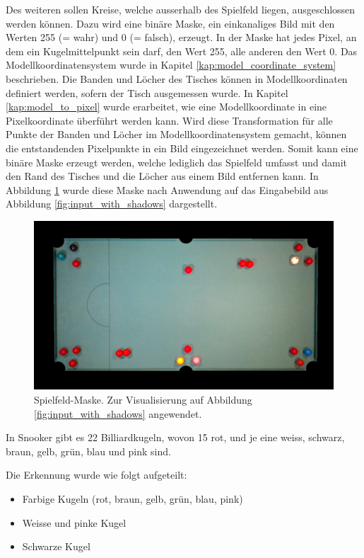 Des weiteren sollen Kreise, welche ausserhalb des Spielfeld liegen, ausgeschlossen werden können.
Dazu wird eine binäre Maske, ein einkanaliges Bild mit den Werten 255 (= wahr) und 0 (= falsch), erzeugt.
In der Maske hat jedes Pixel, an dem ein Kugelmittelpunkt sein darf, den Wert 255, alle anderen den Wert 0.
Das Modellkoordinatensystem wurde in Kapitel \ref{kap:model_coordinate_system} beschrieben.
Die Banden und Löcher des Tisches können in Modellkoordinaten definiert werden, sofern der Tisch ausgemessen wurde.
In Kapitel \ref{kap:model_to_pixel} wurde erarbeitet, wie eine Modellkoordinate in eine Pixelkoordinate überführt werden kann.
Wird diese Transformation für alle Punkte der Banden und Löcher im Modellkoordinatensystem gemacht, können die
entstandenden Pixelpunkte in ein Bild eingezeichnet werden.
Somit kann eine binäre Maske erzeugt werden, welche lediglich das Spielfeld umfasst und damit den Rand des Tisches
und die Löcher aus einem Bild entfernen kann. In Abbildung \ref{fig:table_mask_applied} wurde diese Maske nach Anwendung
auf das Eingabebild aus Abbildung \ref{fig:input_with_shadows} dargestellt.

\begin{figure}[h!]
    \begin{center}
    \includegraphics[width=0.8\linewidth]{../common/resources/detection/table_mask_applied.png}
    \end{center}
    \caption{Spielfeld-Maske. Zur Visualisierung auf Abbildung \ref{fig:input_with_shadows} angewendet.}
    \label{fig:table_mask_applied}
\end{figure}

In Snooker gibt es 22 Billiardkugeln, wovon 15 rot, und je eine weiss, schwarz, braun, gelb, grün, blau und pink sind.

Die Erkennung wurde wie folgt aufgeteilt:
\begin{itemize}
  \item Farbige Kugeln (rot, braun, gelb, grün, blau, pink)
  \item Weisse und pinke Kugel
  \item Schwarze Kugel
\end{itemize}

